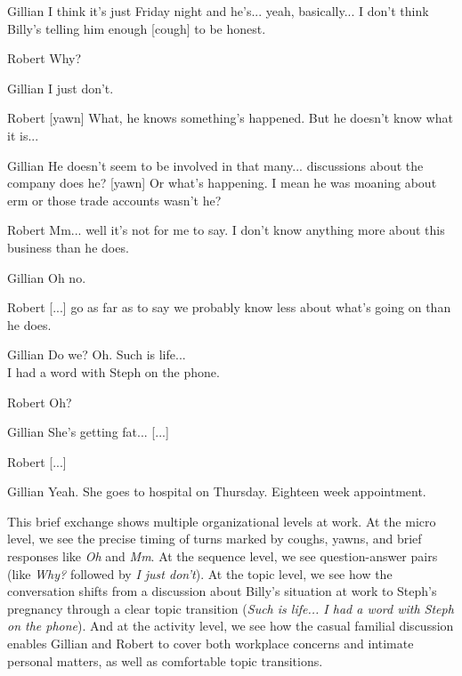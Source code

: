 \ea
\begin{dialogue}
\item[Gillian] I think it's just Friday night and he's... yeah, basically... I don't think Billy's telling him enough [cough] to be honest.

\item[Robert] Why?

\item[Gillian] I just don't.

\item[Robert] [yawn] What, he knows something's happened. But he doesn't know what it is...

\item[Gillian] He doesn't seem to be involved in that many... discussions about the company does he? [yawn] Or what's happening. I mean he was moaning about erm or those trade accounts wasn't he?

\item[Robert] Mm... well it's not for me to say. I don't know anything more about this business than he does.

\item[Gillian] Oh no.

\item[Robert] [...] go as far as to say we probably know less about what's going on than he does.

\item[Gillian] Do we? Oh. Such is life... \\I had a word with Steph on the phone.

\item[Robert] Oh?

\item[Gillian] She's getting fat... [...]

\item[Robert] [...]

\item[Gillian] Yeah. She goes to hospital on Thursday. Eighteen week appointment.
\end{dialogue}
\z

This brief exchange shows multiple organizational levels at work. At the micro level, we see the precise timing of turns marked by coughs, yawns, and brief responses like \textit{Oh} and \textit{Mm}. At the sequence level, we see question-answer pairs (like \textit{Why?} followed by \textit{I just don't}). At the topic level, we see how the conversation shifts from a discussion about Billy's situation at work to Steph's pregnancy through a clear topic transition (\textit{Such is life... I had a word with Steph on the phone}). And at the activity level, we see how the casual familial discussion enables Gillian and Robert to cover both workplace concerns and intimate personal matters, as well as comfortable topic transitions.

